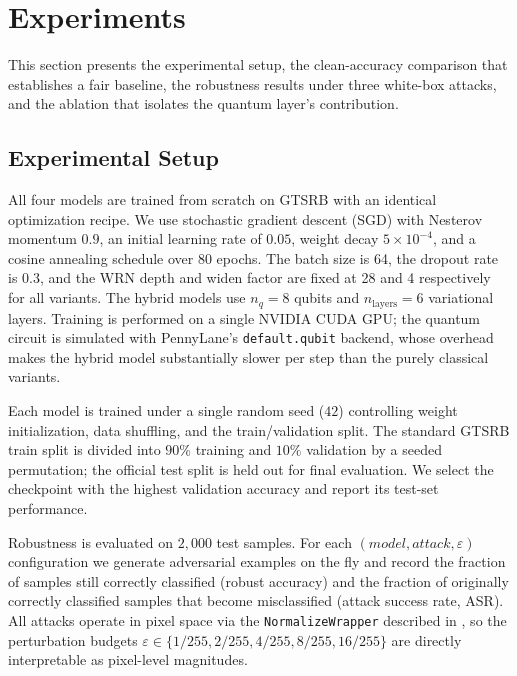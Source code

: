 \documentclass[11pt]{article}
\newcommand{\eps}{\varepsilon}
\begin{document}
\section{Experiments}
\label{sec:experiments}

This section presents the experimental setup, the clean-accuracy
comparison that establishes a fair baseline, the robustness results under
three white-box attacks, and the ablation that isolates the quantum
layer's contribution.

\subsection{Experimental Setup}
\label{sec:exp:setup}

All four models are trained from scratch on GTSRB with an identical
optimization recipe. We use stochastic gradient descent (SGD) with
Nesterov momentum $0.9$, an initial learning rate of $0.05$, weight decay
$5\times10^{-4}$, and a cosine annealing schedule over 80 epochs. The
batch size is 64, the dropout rate is 0.3, and the WRN depth and widen
factor are fixed at 28 and 4 respectively for all variants. The hybrid
models use $n_q=8$ qubits and $n_{\text{layers}}=6$ variational layers.
Training is performed on a single NVIDIA CUDA GPU; the quantum circuit is
simulated with PennyLane's \texttt{default.qubit} backend, whose overhead
makes the hybrid model substantially slower per step than the purely
classical variants.

Each model is trained under a single random seed ($42$) controlling weight
initialization, data shuffling, and the train/validation split. The
standard GTSRB train split is divided into $90\%$ training and $10\%$
validation by a seeded permutation; the official test split is held out
for final evaluation. We select the checkpoint with the highest validation
accuracy and report its test-set performance.

Robustness is evaluated on $2{,}000$ test samples. For each
$(model, attack, \eps)$ configuration we generate adversarial examples on
the fly and record the fraction of samples still correctly classified
(robust accuracy) and the fraction of originally correctly classified
samples that become misclassified (attack success rate, ASR). All attacks
operate in pixel space via the \texttt{NormalizeWrapper} described in
, so the perturbation budgets
$\eps \in \{1/255, 2/255, 4/255, 8/255, 16/255\}$ are directly
interpretable as pixel-level magnitudes.
\end{document}
